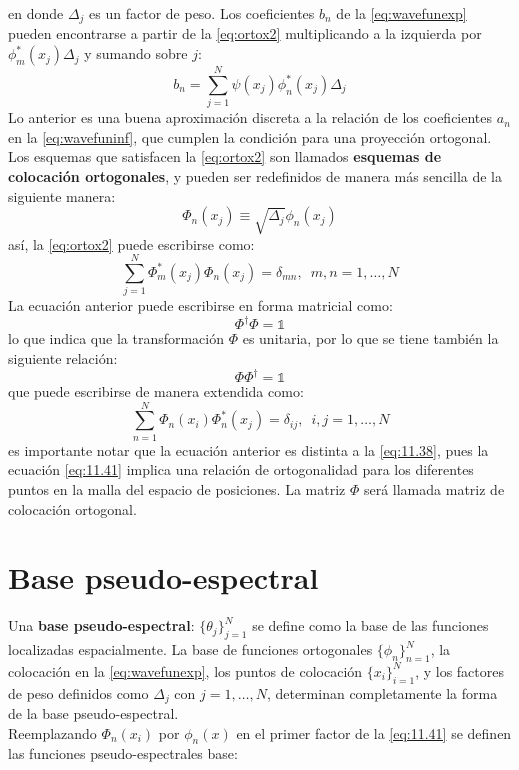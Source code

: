 en donde $\Delta_j$ es un factor de peso. Los coeficientes $b_n$ de la \autoref{eq:wavefunexp} pueden encontrarse a partir de la \autoref{eq:ortox2} multiplicando a la izquierda por $\phi_m^*(x_j)\Delta_j$ y sumando sobre $j$:
\begin{equation}
  \label{eq:11.36}
  b_n = \sum_{j=1}^N\psi(x_j)\phi_n^*(x_j)\Delta_j
\end{equation}
Lo anterior es una buena aproximación discreta a la relación de los coeficientes $a_n$ en la \autoref{eq:wavefuninf}, que cumplen la condición para una proyección ortogonal. Los esquemas que satisfacen la \autoref{eq:ortox2} son llamados \textbf{esquemas de colocación ortogonales}, y pueden ser redefinidos de manera más sencilla de la siguiente manera:
\begin{equation}
  \label{eq:11.37}
  \Phi_n(x_j) \equiv \sqrt{\Delta_j} \phi_n(x_j)
\end{equation}
así, la \autoref{eq:ortox2} puede escribirse como:
\begin{equation}
  \label{eq:11.38}
  \sum_{j=1}^N \Phi_m^*(x_j)\Phi_n(x_j) = \delta_{mn}, \,\,\, m,n=1,\dots,N
\end{equation}
La ecuación anterior puede escribirse en forma matricial como:
\begin{equation}
  \label{eq:11.39}
  \Phi^{\dag}\Phi=\mathbb{1}
\end{equation}
lo que indica que la transformación $\Phi$ es unitaria, por lo que se tiene también la siguiente relación:
\begin{equation}
  \label{eq:11.40}
  \Phi\Phi^{\dag} = \mathbb{1}
\end{equation}
que puede escribirse de manera extendida como:
\begin{equation}
  \label{eq:11.41}
  \sum_{n=1}^N \Phi_n(x_i)\Phi_n^*(x_j) = \delta_{ij}, \,\,\, i,j=1,\dots,N
\end{equation}
es importante notar que la ecuación anterior es distinta a la \autoref{eq:11.38}, pues la ecuación \autoref{eq:11.41} implica una relación de ortogonalidad para los diferentes puntos en la malla del espacio de posiciones. La matriz $\Phi$ será llamada matriz de colocación ortogonal.

\section{Base pseudo-espectral}

Una \textbf{base pseudo-espectral}: $\{\theta_j\}_{j=1}^N$ se define como la base de las funciones localizadas espacialmente. La base de funciones ortogonales $\{\phi_n\}_{n=1}^N$, la colocación en la \autoref{eq:wavefunexp}, los puntos de colocación $\{x_i\}_{i=1}^N$, y los factores de peso definidos como $\Delta_j$ con $j=1,\dots,N$, determinan completamente la forma de la base pseudo-espectral. \\
Reemplazando $\Phi_n(x_i)$ por $\phi_n(x)$ en el primer factor de la \autoref{eq:11.41} se definen las funciones pseudo-espectrales base:

